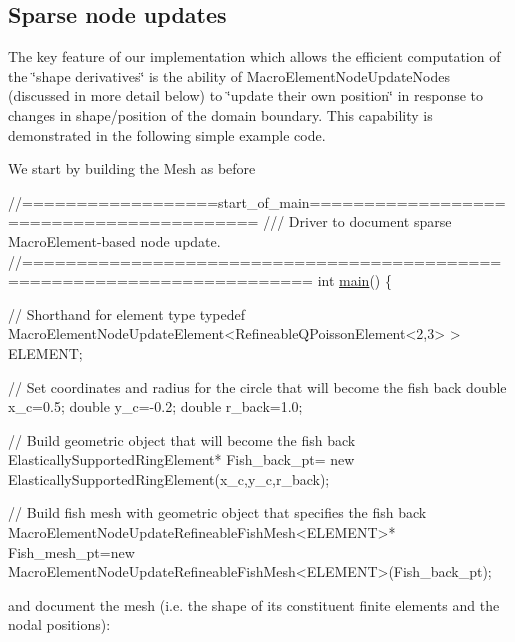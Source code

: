 \hypertarget{index_sparse_node_updates}{}\subsection{Sparse node updates}\label{index_sparse_node_updates}
The key feature of our implementation which allows the efficient computation of the \char`\"{}shape derivatives\char`\"{} is the ability of {\ttfamily Macro\+Element\+Node\+Update\+Nodes} (discussed in more detail below) to \char`\"{}update their own position\char`\"{} in response to changes in shape/position of the domain boundary. This capability is demonstrated in the following simple example code.

We start by building the Mesh as before

 
\begin{DoxyCodeInclude}
\textcolor{comment}{//==================start\_of\_main=========================================}
\textcolor{comment}{/// Driver to document sparse MacroElement-based node update.}
\textcolor{comment}{}\textcolor{comment}{//========================================================================}
\textcolor{keywordtype}{int} \hyperlink{algebraic__free__boundary__poisson_8cc_a0ddf1224851353fc92bfbff6f499fa97}{main}()
\{

 \textcolor{comment}{// Shorthand for element type}
 \textcolor{keyword}{typedef} MacroElementNodeUpdateElement<RefineableQPoissonElement<2,3> > 
  ELEMENT;

 \textcolor{comment}{// Set coordinates and radius for the circle that will become the fish back}
 \textcolor{keywordtype}{double} x\_c=0.5;
 \textcolor{keywordtype}{double} y\_c=-0.2;
 \textcolor{keywordtype}{double} r\_back=1.0;

 \textcolor{comment}{// Build geometric object that will become the fish back}
  ElasticallySupportedRingElement* Fish\_back\_pt=
   \textcolor{keyword}{new} ElasticallySupportedRingElement(x\_c,y\_c,r\_back);

 \textcolor{comment}{// Build fish mesh with geometric object that specifies the fish back }
 MacroElementNodeUpdateRefineableFishMesh<ELEMENT>* Fish\_mesh\_pt=\textcolor{keyword}{new} 
  MacroElementNodeUpdateRefineableFishMesh<ELEMENT>(Fish\_back\_pt);

\end{DoxyCodeInclude}


and document the mesh (i.\+e. the shape of its constituent finite elements and the nodal positions)\+:




